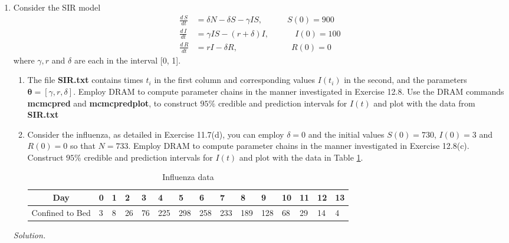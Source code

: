 \documentclass[11pt]{article}
\begin{document}
\begin{enumerate}
\item Consider the SIR model
 \begin{align*}
    \frac{d\, S}{dt}&=\delta N-\delta S-\gamma  I S,  \qquad \quad  S(0)=900\\
    \frac{d\, I}{dt}&=\gamma  I S-(r+\delta)I, \quad\, \qquad  I(0)=100\\
     \frac{d\, R}{dt}&=rI-\delta R, \qquad  \qquad \qquad \,\,\, R(0)=0
    \end{align*} where $\gamma, r$ and $\delta$ are each in the interval [0, 1].
    \begin{enumerate}
        \item The file {\bf SIR.txt} contains times $t_i$ in the first column and corresponding values $I(t_i)$ in the second, and the parameters $\pmb{\theta} = [\gamma, r,\delta ]$. Employ DRAM to compute parameter chains in the manner investigated in Exercise 12.8. Use the DRAM commands {\bf mcmcpred} and {\bf mcmcpredplot}, to construct $95\%$ credible and prediction intervals for $I(t)$ and plot with the data from {\bf SIR.txt}
        \item Consider the influenza, as detailed in Exercise 11.7(d), you can employ $ \delta= 0$ and the initial values $S(0) = 730$, $I(0) = 3$ and $R(0) = 0$ so that $N = 733$. Employ DRAM to compute parameter chains in the manner investigated in Exercise 12.8(c). Construct $95\%$ credible and prediction intervals for $I(t)$ and plot with the data in Table \ref{tab4}.
\begin{table}[!htb]
\centering
\begin{tabular}{|l|l|l|l|l|l|l|l|l|l|l|l|l|l|l|}
\hline
\multicolumn{1}{|c|}{Day} & 0 & 1 & 2  & 3  & 4   & 5   & 6   & 7   & 8   & 9   & 10 & 11 & 12 & 13 \\ \hline
Confined to Bed           & 3 & 8 & 26 & 76 & 225 & 298 & 258 & 233 & 189 & 128 & 68 & 29 & 14 & 4  \\ \hline
\end{tabular}
\caption{Influenza data}
\label{tab4}
\end{table}   

    \end{enumerate}
    
{\em Solution.} 


\end{enumerate}
\end{document}
